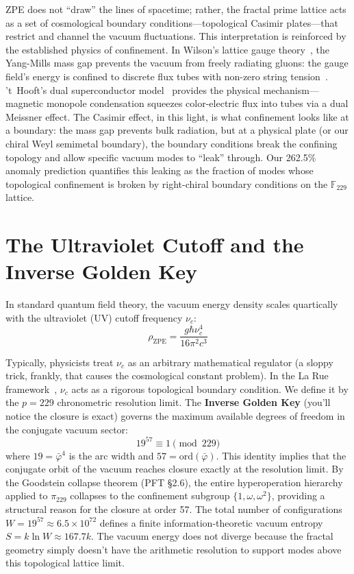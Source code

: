 ZPE does not ``draw'' the lines of spacetime; rather, the fractal prime lattice acts as a set of cosmological boundary conditions---topological Casimir plates---that restrict and channel the vacuum fluctuations. This interpretation is reinforced by the established physics of confinement. In Wilson's lattice gauge theory~\cite{wilson1974}, the Yang-Mills mass gap prevents the vacuum from freely radiating gluons: the gauge field's energy is confined to discrete flux tubes with non-zero string tension~\cite{creutz1980}. 't~Hooft's dual superconductor model~\cite{thooft1981} provides the physical mechanism---magnetic monopole condensation squeezes color-electric flux into tubes via a dual Meissner effect. The Casimir effect, in this light, is what confinement looks like at a boundary: the mass gap prevents bulk radiation, but at a physical plate (or our chiral Weyl semimetal boundary), the boundary conditions break the confining topology and allow specific vacuum modes to ``leak'' through. Our 262.5\% anomaly prediction quantifies this leaking as the fraction of modes whose topological confinement is broken by right-chiral boundary conditions on the $\mathbb{F}_{229}$ lattice.

\section{The Ultraviolet Cutoff and the Inverse Golden Key}\label{sec:uv}

In standard quantum field theory, the vacuum energy density scales quartically with the ultraviolet (UV) cutoff frequency $\nu_c$:
\begin{equation}\label{eq:zpe}
    \rho_{\text{ZPE}} = \frac{g \hbar \nu_c^4}{16 \pi^2 c^3}
\end{equation}

Typically, physicists treat $\nu_c$ as an arbitrary mathematical regulator (a sloppy trick, frankly, that causes the cosmological constant problem). In the La Rue framework~\cite{larue2026lc}, $\nu_c$ acts as a rigorous topological boundary condition. We define it by the $p=229$ chronometric resolution limit. The \textbf{Inverse Golden Key} (you'll notice the closure is exact) governs the maximum available degrees of freedom in the conjugate vacuum sector:
\begin{equation}\label{eq:key}
    19^{57} \equiv 1 \pmod{229}
\end{equation}
where $19 = \bar{\varphi}^4$ is the arc width and $57 = \text{ord}(\bar{\varphi})$. This identity implies that the conjugate orbit of the vacuum reaches closure exactly at the resolution limit. By the Goodstein collapse theorem (PFT \S2.6), the entire hyperoperation hierarchy applied to $\pi_{229}$ collapses to the confinement subgroup $\{1, \omega, \omega^2\}$, providing a structural reason for the closure at order 57. The total number of configurations $W = 19^{57} \approx 6.5 \times 10^{72}$ defines a finite information-theoretic vacuum entropy $S = k \ln W \approx 167.7 k$. The vacuum energy does not diverge because the fractal geometry simply doesn't have the arithmetic resolution to support modes above this topological lattice limit.


